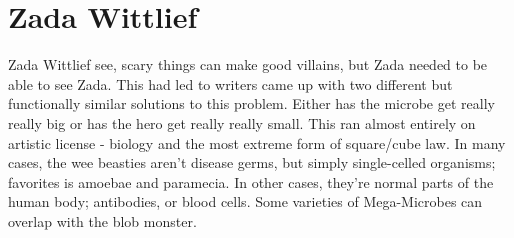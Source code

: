 \documentclass[12pt]{book}
\begin{document}
\chapter{Zada Wittlief}

Zada Wittlief see, scary things can make good villains, but Zada needed to be able to see Zada. This had led to writers came up with two different but functionally similar solutions to this problem. Either has the microbe get really really big or has the hero get really really small. This ran almost entirely on artistic license - biology and the most extreme form of square/cube law. In many cases, the wee beasties aren't disease germs, but simply single-celled organisms; favorites is amoebae and paramecia. In other cases, they're normal parts of the human body; antibodies, or blood cells. Some varieties of Mega-Microbes can overlap with the blob monster.
\end{document}
